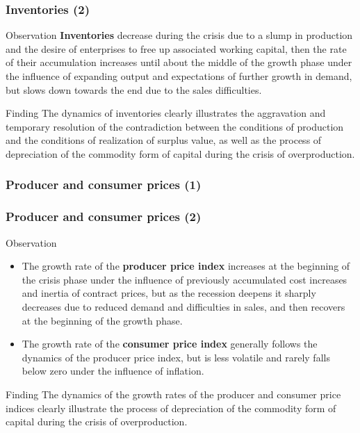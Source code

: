\begin{frame}
  \frametitle{Inventories (2)}
  \begin{block}{Observation}
    \textbf{Inventories} decrease during the crisis due to a slump in production and the desire of enterprises to free up associated working capital, then the rate of their accumulation increases until about the middle of the growth phase under the influence of expanding output and expectations of further growth in demand, but slows down towards the end due to the sales difficulties.
  \end{block}

  \begin{alertblock}{Finding}
    The dynamics of inventories clearly illustrates the aggravation and temporary resolution of the contradiction between the conditions of production and the conditions of realization of surplus value, as well as the process of depreciation of the commodity form of capital during the crisis of overproduction.
  \end{alertblock}
\end{frame}

\begin{frame}
  \frametitle{Producer and consumer prices (1)}
  \begin{center}
  \end{center}
\end{frame}

\begin{frame}
  \frametitle{Producer and consumer prices (2)}
  \begin{block}{Observation}
    \begin{itemize}
      \item The growth rate of the \textbf{producer price index} increases at the beginning of the crisis phase under the influence of previously accumulated cost increases and inertia of contract prices, but as the recession deepens it sharply decreases due to reduced demand and difficulties in sales, and then recovers at the beginning of the growth phase.
      \item The growth rate of the \textbf{consumer price index} generally follows the dynamics of the producer price index, but is less volatile and rarely falls below zero under the influence of inflation.
    \end{itemize}
  \end{block}

  \begin{alertblock}{Finding}
    The dynamics of the growth rates of the producer and consumer price indices clearly illustrate the process of depreciation of the commodity form of capital during the crisis of overproduction.
  \end{alertblock}
\end{frame}

